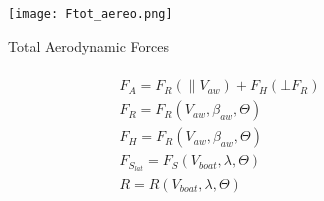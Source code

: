 \begin{figure}
    \centering
    \texttt{[image: Ftot\_aereo.png]}
    \caption{Total Aerodynamic Forces \cite{fossati2009aero}}
    \label{fig:Ftot_aereo}
\end{figure}
\begin{multline}
\\
F_{A}=F_{R}(\parallel V_{aw}) + F_{H}(\bot F_{R} )\\
F_{R}=F_{R}(V_{aw},\beta_{aw}, \Theta) \\
F_{H}=F_{R}(V_{aw},\beta_{aw}, \Theta) \\
F_{S_{lat}}=F_{S}(V_{boat},\lambda, \Theta) \\
R=R(V_{boat},\lambda, \Theta)\\  
\end{multline}

